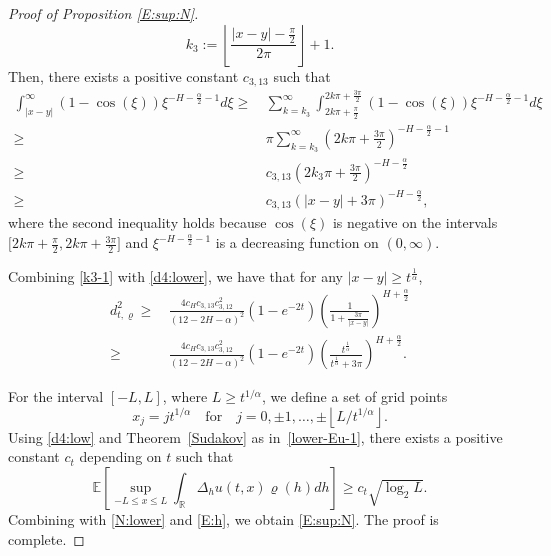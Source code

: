 \documentclass[11pt,reqno]{amsart}
\numberwithin{equation}{section}
\def\RR{\mathbb{R}}
\newcommand{\1}{{\bf 1}}
\newcommand{\2}{{\bf 2}}
\begin{document}
\begin{proof}[Proof of  Proposition \ref{E:sup:N}]
\begin{equation}
 k_3:=\left\lfloor \frac{ |x-y|-\frac{\pi}{2}}{2\pi}\right\rfloor+1.
\end{equation}
Then, there exists a positive constant $c_{3,13}$ such that
\begin{equation}\label{k3-1}
\begin{split}
\int_{|x-y|}^\infty(1-\cos(\xi))
      \xi^{-H-\frac{\alpha}2-1}d\xi
\geq&\, \sum_{k=k_3}^\infty \int_{2k\pi+\frac{\pi}2}^{2k\pi+\frac{3\pi}2}
     (1-\cos(\xi))\xi^{-H-\frac{\alpha}2-1}d\xi  \\
\geq&\, \pi\sum_{k=k_3}^\infty\left(2k\pi+\frac{3\pi}2\right)^{-H-\frac{\alpha}2-1}\\
\ge &\, c_{3,13}\left(2k_3\pi+\frac{3\pi}2\right)^{-H-\frac{\alpha}2}\\
\geq&\,  c_{3,13}\left(|x-y|+3\pi\right)^{-H-\frac{\alpha}2},
\end{split}
\end{equation}
where the second inequality holds because   $\cos(\xi)$ is negative on the intervals  $ \big[2k\pi+\frac{\pi}{2},2k\pi+\frac{3\pi}{2}\big]$ and $\xi^{-H-\frac{\alpha}2-1}$ is a decreasing function on $(0,\infty)$.

Combining \eqref{k3-1} with \eqref{d4:lower},  we have   that for any $|x-y|\geq t^{\frac1\alpha}$,
\begin{equation}\label{d4:low}
\begin{split}
d^2_{t,\varrho}  \geq &\,  \frac{4c_{H} c_{3,13}c_{3,12}^2}{(12-2H-\alpha)^2}\left(1-e^{-2t}\right) \left( \frac1 {1+\frac{3\pi}{|x-y|}}\right)^{H+\frac{\alpha}2}\\
\geq &\, \frac{4c_{H} c_{3,13}c_{3,12}^2}{(12-2H-\alpha)^2}\left(1-e^{-2t}\right)  \left( \frac{ t^{\frac1\alpha} } {t^{\frac1\alpha}+3\pi}\right)^{H+\frac{\alpha}2}.
\end{split}
\end{equation}

For the   interval $[-L, L]$, where  $L \geq t^{1/\alpha}$, we define a set of  grid points
\[
x_j = j t^{1/\alpha}  \quad \text{for} \quad j = 0, \pm 1, \ldots, \pm\left\lfloor L/t^{1/\alpha} \right\rfloor.
\]
Using \eqref{d4:low} and  Theorem~\ref{Sudakov} as in~\eqref{lower-Eu-1}, there exists a positive constant $c_{t}$ depending on $t$ such that
\begin{equation}\label{E:h}
\mathbb E\left[ \sup_{-L\leq x\leq L}\int_{\RR}\Delta_h u(t,x)\varrho(h)dh\right]\geq c_t\sqrt{\log_2 L}.
\end{equation}
Combining with    \eqref{N:lower} and \eqref{E:h}, we obtain \eqref{E:sup:N}.
The proof is complete.
 \end{proof}
\end{document}
